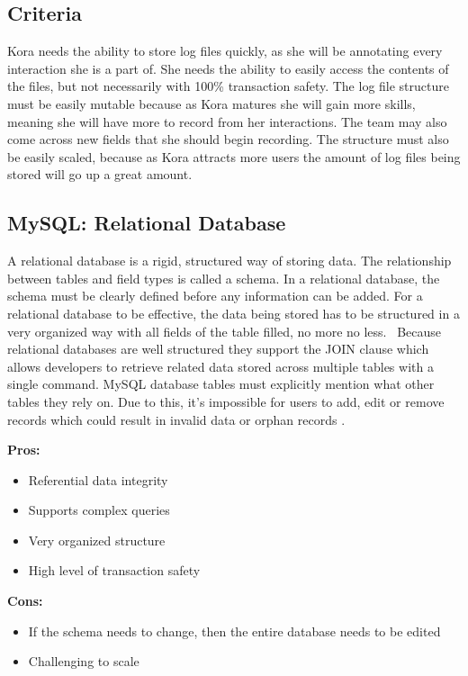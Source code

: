 \documentclass[onecolumn, draftclsnofoot,10pt, compsoc]{IEEEtran}
\begin{document}
		\subsection{Criteria}
			Kora needs the ability to store log files quickly, as she will be annotating every interaction she is a part of.
			She needs the ability to easily access the contents of the files, but not necessarily with 100\% transaction safety.
			The log file structure must be easily mutable because as Kora matures she will gain more skills, meaning she will have more to record from her interactions.
			The team may also come across new fields that she should begin recording.
			The structure must also be easily scaled, because as Kora attracts more users the amount of log files being stored will go up a great amount.
		
	
		\subsection{MySQL: Relational Database}
			A relational database is a rigid, structured way of storing data.
			The relationship between tables and field types is called a schema. 
			In a relational database, the schema must be clearly defined before any information can be added.
			For a relational database to be effective, the data being stored has to be structured in a very organized way with all fields of the table filled, no more no less. 
			Because relational databases are well structured they support the JOIN clause which allows developers to retrieve related data stored across multiple tables with a single command.
			MySQL database tables must explicitly mention what other tables they rely on.
			Due to this, it's impossible for users to add, edit or remove records which could result in invalid data or orphan records \cite{SQLvsNoSQLsitepoint}.
			
			\textbf{Pros:}
				\begin{itemize}
					\item{
						Referential data integrity}
					\item{
						Supports complex queries}
					\item{
						Very organized structure}
					\item{
						High level of transaction safety}
				\end{itemize}
			\textbf{Cons:}
				\begin{itemize}
				\item{
					If the schema needs to change, then the entire database needs to be edited \cite{SQLvsNoSQLupwork} }
				\item{
					Challenging to scale}
				
				\end{itemize}
			
\end{document}

